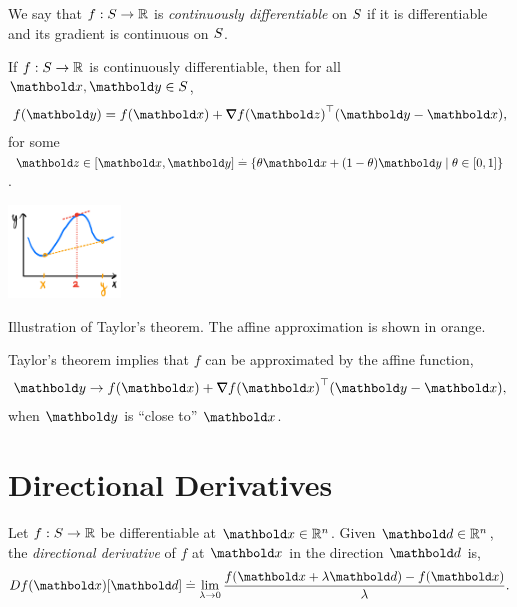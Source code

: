 \begin{defn} We say that $f : S \to \mathbb{R}$ is \emph{continuously differentiable} on $S$ if it is differentiable and its gradient is continuous on $S$.
\end{defn}

\begin{thm} If $f: S \to \mathbb{R}$ is continuously differentiable, then for all $\vx, \vy \in \sS$, \begin{align}
    f(\vy) = f(\vx) + \trans{\grad f(\vz)}(\vy - \vx),
\end{align} for some $\vz \in [\vx, \vy] \defeq \{\theta\vx + (1-\theta)\vy \mid \theta \in [0,1]\}$.
\end{thm}\begin{marginfigure}
\centering\includegraphics[width=3cm]{notes/figures/taylors_theorem.png}
\caption{Illustration of Taylor's theorem. The affine approximation is shown in orange.}
\end{marginfigure}\noindent Taylor's theorem implies that $f$ can be approximated by the affine function, \begin{align*}
    \vy \to f(\vx) + \trans{\grad f(\vx)}(\vy - \vx),
\end{align*} when $\vy$ is ``close to'' $\vx$.

\section{Directional Derivatives}

\begin{defn} Let $f: S \to \mathbb{R}$ be differentiable at $\vx \in \R^n$. Given $\vd \in \R^n$, the \emph{directional derivative} of $f$ at $\vx$ in the direction $\vd$ is, \begin{align}
    D f(\vx)[\vd] \defeq \lim_{\lambda \to 0} \frac{f(\vx + \lambda\vd) - f(\vx)}{\lambda}.
\end{align}
\end{defn}

